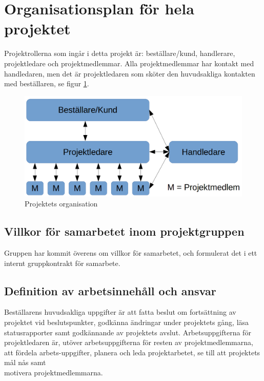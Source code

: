 \documentclass[a4paper,titlepage,12pt]{article}
\begin{document}
	
	\section{Organisationsplan för hela projektet}
	Projektrollerna som ingår i detta projekt är: beställare/kund, handlerare,
	projektledare och projektmedlemmar. Alla projektmedlemmar har kontakt med
	handledaren, men det är projektledaren som sköter den huvudsakliga
	kontakten med beställaren, se figur \ref{fig:organization}.

	\begin{figure}[h!]
		\begin{center}
		\includegraphics[width=0.8\linewidth]{images/projectroles.png}
		\caption{Projektets organisation \label{fig:organization}}
		\end{center}
	\end{figure}
	 
	\subsection{Villkor för samarbetet inom projektgruppen}
    Gruppen har kommit överens om villkor för samarbetet, och formulerat det i
    ett internt gruppkontrakt för samarbete.
	
	\subsection{Definition av arbetsinnehåll och ansvar}
	Beställarens huvudsakliga uppgifter är att fatta beslut
	om fortsättning av projektet vid beslutspunkter, godkänna
	ändringar under projektets gång, läsa statusrapporter samt godkännande av
	projektets avslut. Arbetsuppgifterna för projektledaren är, utöver
	arbetsuppgifterna för resten av projektmedlemmarna, att fördela
	arbets-uppgifter, planera och leda projektarbetet, se till att projektets mål
	nås samt \\ motivera projektmedlemmarna.
\end{document}
